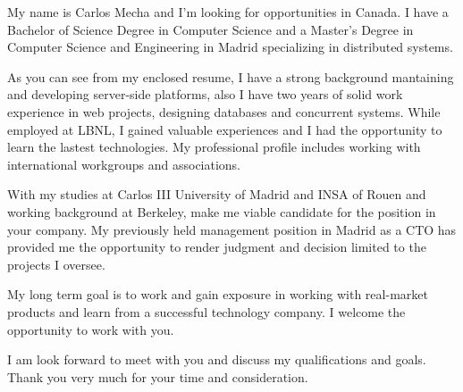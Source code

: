 My name is Carlos Mecha and I'm looking for opportunities in Canada. I have a
Bachelor of Science Degree in Computer Science and a Master's Degree in
Computer Science and Engineering in Madrid specializing in distributed systems.

As you can see from my enclosed resume, I have a strong background mantaining
and developing server-side platforms, also I have two years of solid work
experience in web projects, designing databases and concurrent systems. While
employed at LBNL, I gained valuable experiences and I had the opportunity to
learn the lastest technologies. My professional profile includes working with
international workgroups and associations. 

With my studies at Carlos III University of Madrid and INSA of Rouen and
working background at Berkeley, make me viable candidate for the
\textbf{\thePosition} position in your company. My previously held management
position in Madrid as a CTO has provided me the opportunity to render judgment
and decision limited to the projects I oversee.

My long term goal is to work and gain exposure in working with real-market
products and learn from a successful technology company. I welcome the
opportunity to work with you.

I am look forward to meet with you and discuss my qualifications and goals.
Thank you very much for your time and consideration.
